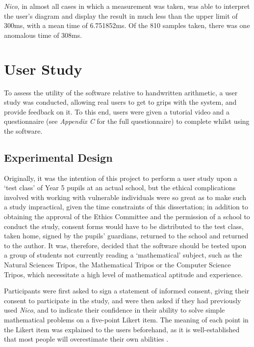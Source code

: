 \documentclass[12pt,twoside,notitlepage,xetex]{report}
\begin{document}
{\emph{Nico}, in almost all cases in which a measurement was taken, was able to interpret the user's diagram and display the result in much less than the upper limit of 300ms, with a mean time of 6.751852ms.  Of the 810 samples taken, there was one anomalous time of 308ms.

%
\section{User Study}

To assess the utility of the software relative to handwritten arithmetic, a user study was conducted, allowing real users to get to grips with the system, and provide feedback on it.  To this end, users were given a tutorial video and a questionnaire (see \emph{Appendix C} for the full questionnaire) to complete whilst using the software.

\subsection{Experimental Design}

Originally, it was the intention of this project to perform a user study upon a `test class' of Year 5 pupils at an actual school, but the ethical complications involved with working with vulnerable individuals were so great as to make such a study impractical, given the time constraints of this dissertation; in addition to obtaining the approval of the Ethics Committee and the permission of a school to conduct the study, consent forms would have to be distributed to the test class, taken home, signed by the pupils' guardians, returned to the school and returned to the author.  It was, therefore, decided that the software should be tested upon a group of students not currently reading a `mathematical' subject, such as the Natural Sciences Tripos, the Mathematical Tripos or the Computer Science Tripos, which necessitate a high level of mathematical aptitude and experience.

Participants were first asked to sign a statement of informed consent, giving their consent to participate in the study, and were then asked if they had previously used \emph{Nico}, and to indicate their confidence in their ability to solve simple mathematical problems on a five-point Likert item.  The meaning of each point in the Likert item was explained to the users beforehand, as it is well-established that most people will overestimate their own abilities \cite{Mura1987}.

}
\end{document}
